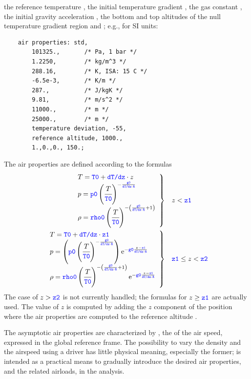 the reference temperature , the initial temperature
gradient , the gas constant , the
initial gravity acceleration , the bottom and top
altitudes of the null temperature gradient region  and
; e.g., for SI units:
\begin{verbatim}
    air properties: std,
        101325.,       /* Pa, 1 bar */
        1.2250,        /* kg/m^3 */
        288.16,        /* K, ISA: 15 C */
        -6.5e-3,       /* K/m */
        287.,          /* J/kgK */
        9.81,          /* m/s^2 */
        11000.,        /* m */
        25000.,        /* m */
        temperature deviation, -55,
        reference altitude, 1000.,
        1.,0.,0., 150.;
\end{verbatim}
The air properties are defined according to the formulas
\begin{subequations}
\begin{align}
	\left. \begin{array}{l} 
		T = \textcolor{blue}{\texttt{T0}} + \textcolor{blue}{\texttt{dT/dz}} \cdot z
		\\
		p = \textcolor{blue}{\texttt{p0}} \left( \cfrac{T}{\textcolor{blue}{\texttt{T0}}} \right)^{-\frac{\textcolor{blue}{\texttt{g0}}}{\textcolor{blue}{\texttt{dT/dz}} \cdot \textcolor{blue}{\texttt{R}}}}
		\\
		\rho = \textcolor{blue}{\texttt{rho0}} \left( \cfrac{T}{\textcolor{blue}{\texttt{T0}}} \right)^{-\left( \frac{\textcolor{blue}{\texttt{g0}}}{\textcolor{blue}{\texttt{dT/dz}} \cdot \textcolor{blue}{\texttt{R}}} + 1 \right)}
	 \end{array} \right\}
	&&& z < \textcolor{blue}{\texttt{z1}}
	\\
	\left. \begin{array}{l} 
		T = \textcolor{blue}{\texttt{T0}} + \textcolor{blue}{\texttt{dT/dz}} \cdot \textcolor{blue}{\texttt{z1}}
		\\
		p = \left( \textcolor{blue}{\texttt{p0}}\left( \cfrac{T}{\textcolor{blue}{\texttt{T0}}} \right)^{-\frac{\textcolor{blue}{\texttt{g0}}}{\textcolor{blue}{\texttt{dT/dz}} \cdot \textcolor{blue}{\texttt{R}}}} \right)
			\mathrm{e}^{-\textcolor{blue}{\texttt{g0}} \frac{z - \textcolor{blue}{\texttt{z1}}}{\textcolor{blue}{\texttt{dT/dz}} \cdot \textcolor{blue}{\texttt{R}}}}
		\\
		\rho = \textcolor{blue}{\texttt{rho0}} \left( \cfrac{T}{\textcolor{blue}{\texttt{T0}}} \right)^{-\left( \frac{\textcolor{blue}{\texttt{g0}}}{\textcolor{blue}{\texttt{dT/dz}} \cdot \textcolor{blue}{\texttt{R}}} + 1 \right)}
			\mathrm{e}^{-\textcolor{blue}{\texttt{g0}} \frac{z - \textcolor{blue}{\texttt{z1}}}{\textcolor{blue}{\texttt{dT/dz}} \cdot \textcolor{blue}{\texttt{R}}}}
	 \end{array} \right\}
	&&& \textcolor{blue}{\texttt{z1}} \le z < \textcolor{blue}{\texttt{z2}}
\end{align}
\end{subequations}
The case of $z > \textcolor{blue}{\texttt{z2}}$ is not currently handled;
the formulas for $z \ge \textcolor{blue}{\texttt{z1}}$ are actually used.
The value of $z$ is computed by adding the $z$ component
of the position where the air properties are computed
to the reference altitude .

The asymptotic air properties are characterized by ,
the  of the air speed,
expressed in the global reference frame.
The possibility to vary the density and the airspeed using a driver
has little physical meaning, especially the former;
is intended as a practical means to gradually introduce
the desired air properties, and the related airloads, in the analysis.

